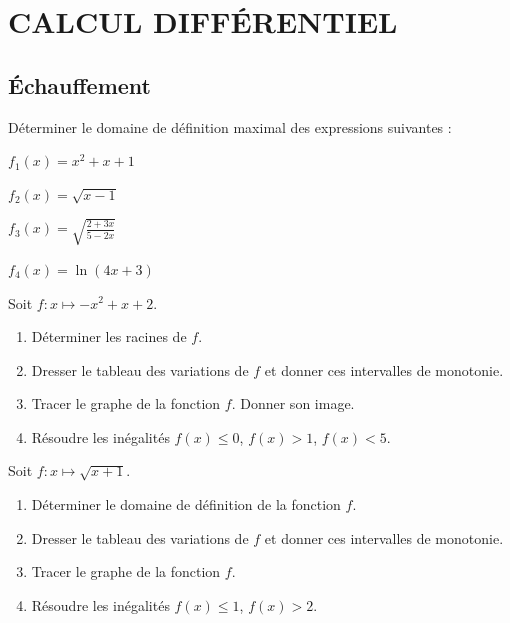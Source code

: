 
\section{CALCUL DIFFÉRENTIEL}
\setcounter{page}{1}
\subsection{Échauffement}

\begin{exo}
    Déterminer le domaine de définition maximal des expressions suivantes :
    \begin{examplescol}{2}
        \item $f_1(x) = x^2 +x+1$
        \item $f_2(x) = \sqrt {x-1}$
        \item $f_3(x) = \sqrt{\frac{2 + 3 x}{5-2x}}$
        \item $f_4(x) = \ln (4 x + 3)$
    \end{examplescol}
\end{exo}

\begin{exo}
    Soit $f : x\mapsto -x^2+x+2$.
    \begin{enumerate}
        \item Déterminer les racines de $f$.
        \item Dresser le tableau des variations de $f$ et donner ces intervalles de monotonie.
        \item Tracer le graphe de la fonction $f$. Donner son image.
        \item Résoudre les inégalités $f(x) \leq 0$, $f(x) > 1$, $f(x) < 5$.
    \end{enumerate}
\end{exo}

\begin{exo}
    Soit $f : x\mapsto \sqrt{x+1}$.
    \begin{enumerate}
        \item Déterminer le domaine de définition de la fonction $f$.
        \item Dresser le tableau des variations de $f$ et donner ces intervalles de monotonie.
        \item Tracer le graphe de la fonction $f$.
        \item Résoudre les inégalités $f(x) \leq 1$, $f(x) > 2$.
    \end{enumerate}
\end{exo}

